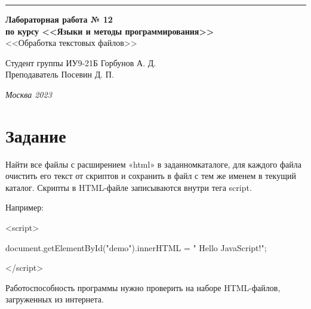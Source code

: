 \documentclass[a4paper, 14pt]{extarticle}
\begin{document}
\begin{titlepage}
\vspace*{-16pt}
\hspace{30pt}\rule{0.866\textwidth}{0.4pt}
  
\vspace{11em}

\begin{center}
\Large {\bf Лабораторная работа № 12} \\ 
\large {\bf по курсу <<Языки и методы программирования>>} \\
\large <<Обработка текстовых файлов>> 
\end{center}\normalsize

\vspace{8em}


\begin{flushright}
  {Студент группы ИУ9-21Б Горбунов А. Д. \hspace*{15pt}\\ 
  \vspace{2ex}
  Преподаватель Посевин Д. П.\hspace*{15pt}}
\end{flushright}

\bigskip

\vfill
 

\begin{center}
\textsl{Москва 2023}
\end{center}
\end{titlepage}

\renewcommand{\ttdefault}{pcr}

\setlength{\tabcolsep}{3pt}
\newpage
\setcounter{page}{2}

\section{Задание}\label{Sect::task}
    Найти все файлы с расширением «html» в заданномкаталоге, для каждого файла очистить его текст от скриптов и сохранить в файл с тем же именем в текущий каталог. Скрипты в HTML-файле записываются внутри тега script.
    
    Например:
    
    <script>
    
        document.getElementById("demo").innerHTML = " Hello JavaScript!";
        
    </script>
    
    Работоспособность программы нужно проверить на наборе HTML-файлов, загруженных из интернета.
\end{document}
